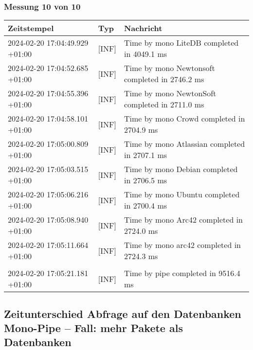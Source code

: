     \subsubsection*{Messung 10 von 10} \label{subsubsec:LiteDbWenigerPaketeAlsDb10von10}
        {
            {\small
                \begin{tabularx}{\textwidth}{|l|l|X|}
                    \hline
                    \textbf{Zeitstempel} & \textbf{Typ} & \textbf{Nachricht} \\
                    \hline
                    \endhead
                    2024-02-20 17:04:49.929 +01:00 & [INF] & Time by mono LiteDB completed in 4049.1 ms \\
                    2024-02-20 17:04:52.685 +01:00 & [INF] & Time by mono Newtonsoft completed in 2746.2 ms \\
                    2024-02-20 17:04:55.396 +01:00 & [INF] & Time by mono NewtonSoft completed in 2711.0 ms \\
                    2024-02-20 17:04:58.101 +01:00 & [INF] & Time by mono Crowd completed in 2704.9 ms \\
                    2024-02-20 17:05:00.809 +01:00 & [INF] & Time by mono Atlassian completed in 2707.1 ms \\
                    2024-02-20 17:05:03.515 +01:00 & [INF] & Time by mono Debian completed in 2706.5 ms \\
                    2024-02-20 17:05:06.216 +01:00 & [INF] & Time by mono Ubuntu completed in 2700.4 ms \\
                    2024-02-20 17:05:08.940 +01:00 & [INF] & Time by mono Arc42 completed in 2724.0 ms \\
                    2024-02-20 17:05:11.664 +01:00 & [INF] & Time by mono arc42 completed in 2724.3 ms \\
                    & & \\
                    2024-02-20 17:05:21.181 +01:00 & [INF] & Time by pipe completed in 9516.4 ms \\
                    \hline
                \end{tabularx}
            }
        }

\subsection{Zeitunterschied Abfrage auf den Datenbanken Mono-Pipe -- Fall: mehr Pakete als Datenbanken} \label{subsec:ZeitunterschiedAbfrageAufDenDatenbankenMonoPipeFallMehrPaketeAlsDatenbanken}
